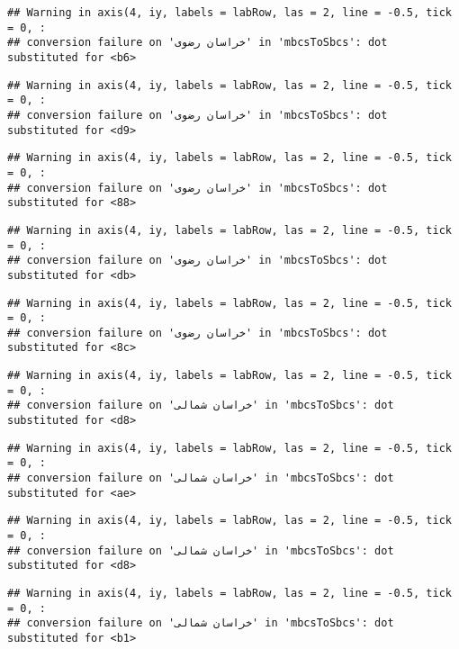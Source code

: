 \documentclass[
]{article}
\begin{document}
\begin{verbatim}
## Warning in axis(4, iy, labels = labRow, las = 2, line = -0.5, tick = 0, :
## conversion failure on 'خراسان رضوی' in 'mbcsToSbcs': dot substituted for <b6>
\end{verbatim}

\begin{verbatim}
## Warning in axis(4, iy, labels = labRow, las = 2, line = -0.5, tick = 0, :
## conversion failure on 'خراسان رضوی' in 'mbcsToSbcs': dot substituted for <d9>
\end{verbatim}

\begin{verbatim}
## Warning in axis(4, iy, labels = labRow, las = 2, line = -0.5, tick = 0, :
## conversion failure on 'خراسان رضوی' in 'mbcsToSbcs': dot substituted for <88>
\end{verbatim}

\begin{verbatim}
## Warning in axis(4, iy, labels = labRow, las = 2, line = -0.5, tick = 0, :
## conversion failure on 'خراسان رضوی' in 'mbcsToSbcs': dot substituted for <db>
\end{verbatim}

\begin{verbatim}
## Warning in axis(4, iy, labels = labRow, las = 2, line = -0.5, tick = 0, :
## conversion failure on 'خراسان رضوی' in 'mbcsToSbcs': dot substituted for <8c>
\end{verbatim}

\begin{verbatim}
## Warning in axis(4, iy, labels = labRow, las = 2, line = -0.5, tick = 0, :
## conversion failure on 'خراسان شمالی' in 'mbcsToSbcs': dot substituted for <d8>
\end{verbatim}

\begin{verbatim}
## Warning in axis(4, iy, labels = labRow, las = 2, line = -0.5, tick = 0, :
## conversion failure on 'خراسان شمالی' in 'mbcsToSbcs': dot substituted for <ae>
\end{verbatim}

\begin{verbatim}
## Warning in axis(4, iy, labels = labRow, las = 2, line = -0.5, tick = 0, :
## conversion failure on 'خراسان شمالی' in 'mbcsToSbcs': dot substituted for <d8>
\end{verbatim}

\begin{verbatim}
## Warning in axis(4, iy, labels = labRow, las = 2, line = -0.5, tick = 0, :
## conversion failure on 'خراسان شمالی' in 'mbcsToSbcs': dot substituted for <b1>
\end{verbatim}
\end{document}
